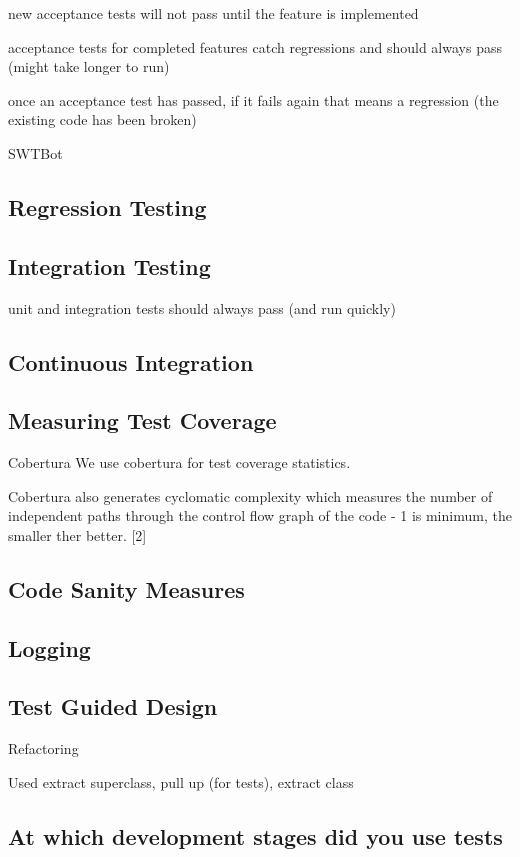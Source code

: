 \documentclass[10pt]{article}
\begin{document}
new acceptance tests will not pass until the feature is implemented

acceptance tests for completed features catch regressions and should always pass (might take
 longer to run)

once an acceptance test has passed, if it fails again that means a regression (the existing code has been broken)

SWTBot

\subsection{Regression Testing}

\subsection{Integration Testing}
unit and integration tests should always pass (and run quickly)

\subsection{Continuous Integration}

\subsection{Measuring Test Coverage}

Cobertura
We use cobertura for test coverage statistics.

Cobertura also generates cyclomatic complexity which measures the number of independent paths through the control flow graph of the code - 1 is minimum, the smaller ther better. [2]
\subsection{Code Sanity Measures}

\subsection{Logging}

\subsection{Test Guided Design}
Refactoring

Used extract superclass, pull up (for tests), extract class


\subsection{At which development stages did you use tests}
\end{document}
